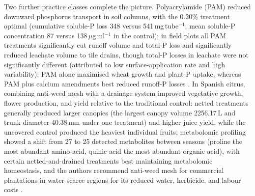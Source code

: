 \documentclass[11pt]{article}
\begin{document}
Two further practice classes complete the picture. Polyacrylamide (PAM) reduced downward phosphorus transport in soil columns, with the 0.20\% treatment optimal (cumulative soluble-P loss 348 versus 541\,mg\,tube$^{-1}$; mean soluble-P concentration 87 versus 138\,$\mu$g\,ml$^{-1}$ in the control); in field plots all PAM treatments significantly cut runoff volume and total-P loss and significantly reduced leachate volume to tile drains, though total-P losses in leachate were not significantly different (attributed to low surface-application rate and high variability); PAM alone maximised wheat growth and plant-P uptake, whereas PAM plus calcium amendments best reduced runoff-P losses \parencite{Jiang2010}. In Spanish citrus, combining anti-weed mesh with a drainage system improved vegetative growth, flower production, and yield relative to the traditional control: netted treatments generally produced larger canopies (the largest canopy volume 2256.17\,L and trunk diameter 40.38\,mm under one treatment) and higher juice yield, while the uncovered control produced the heaviest individual fruits; metabolomic profiling showed a shift from 27 to 25 detected metabolites between seasons (proline the most abundant amino acid, quinic acid the most abundant organic acid), with certain netted-and-drained treatments best maintaining metabolomic homeostasis, and the authors recommend anti-weed mesh for commercial plantations in water-scarce regions for its reduced water, herbicide, and labour costs \parencite{GiménezValero2024,GiménezValero2025}.

\printbibliography
\end{document}

